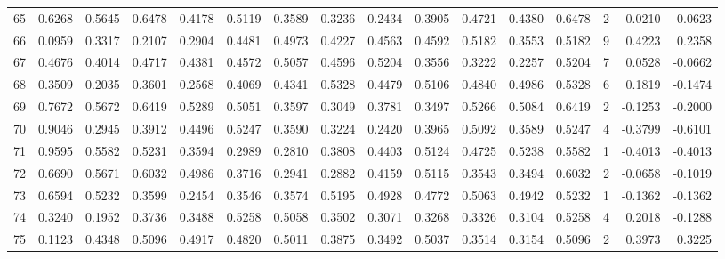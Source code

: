 \begin{tabular}{lrrrrrrrrrrrrrrr}
65  &      0.6268 &  0.5645 &  0.6478 &  0.4178 &  0.5119 &  0.3589 &  0.3236 &  0.2434 &  0.3905 &  0.4721 &   0.4380 &     0.6478 &      2 &                    0.0210 &                    -0.0623 \\
66  &      0.0959 &  0.3317 &  0.2107 &  0.2904 &  0.4481 &  0.4973 &  0.4227 &  0.4563 &  0.4592 &  0.5182 &   0.3553 &     0.5182 &      9 &                    0.4223 &                     0.2358 \\
67  &      0.4676 &  0.4014 &  0.4717 &  0.4381 &  0.4572 &  0.5057 &  0.4596 &  0.5204 &  0.3556 &  0.3222 &   0.2257 &     0.5204 &      7 &                    0.0528 &                    -0.0662 \\
68  &      0.3509 &  0.2035 &  0.3601 &  0.2568 &  0.4069 &  0.4341 &  0.5328 &  0.4479 &  0.5106 &  0.4840 &   0.4986 &     0.5328 &      6 &                    0.1819 &                    -0.1474 \\
69  &      0.7672 &  0.5672 &  0.6419 &  0.5289 &  0.5051 &  0.3597 &  0.3049 &  0.3781 &  0.3497 &  0.5266 &   0.5084 &     0.6419 &      2 &                   -0.1253 &                    -0.2000 \\
70  &      0.9046 &  0.2945 &  0.3912 &  0.4496 &  0.5247 &  0.3590 &  0.3224 &  0.2420 &  0.3965 &  0.5092 &   0.3589 &     0.5247 &      4 &                   -0.3799 &                    -0.6101 \\
71  &      0.9595 &  0.5582 &  0.5231 &  0.3594 &  0.2989 &  0.2810 &  0.3808 &  0.4403 &  0.5124 &  0.4725 &   0.5238 &     0.5582 &      1 &                   -0.4013 &                    -0.4013 \\
72  &      0.6690 &  0.5671 &  0.6032 &  0.4986 &  0.3716 &  0.2941 &  0.2882 &  0.4159 &  0.5115 &  0.3543 &   0.3494 &     0.6032 &      2 &                   -0.0658 &                    -0.1019 \\
73  &      0.6594 &  0.5232 &  0.3599 &  0.2454 &  0.3546 &  0.3574 &  0.5195 &  0.4928 &  0.4772 &  0.5063 &   0.4942 &     0.5232 &      1 &                   -0.1362 &                    -0.1362 \\
74  &      0.3240 &  0.1952 &  0.3736 &  0.3488 &  0.5258 &  0.5058 &  0.3502 &  0.3071 &  0.3268 &  0.3326 &   0.3104 &     0.5258 &      4 &                    0.2018 &                    -0.1288 \\
75  &      0.1123 &  0.4348 &  0.5096 &  0.4917 &  0.4820 &  0.5011 &  0.3875 &  0.3492 &  0.5037 &  0.3514 &   0.3154 &     0.5096 &      2 &                    0.3973 &                     0.3225 \\

\end{tabular}

